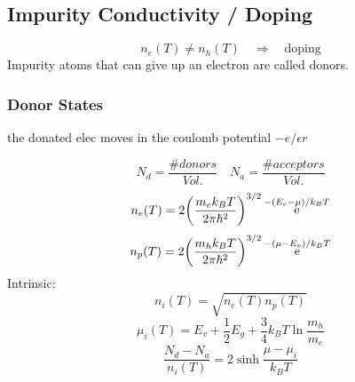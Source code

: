 \documentclass[UTF8]{ctexart} %
\DeclareMathOperator{\e}{\mathrm{e}}
\DeclareMathOperator{\dra}{\Rightarrow}
\numberwithin{equation}{section}
\begin{document}
\subsection{Impurity Conductivity / Doping}
\begin{equation}\label{key}
n_e(T) \neq n_h(T) \quad\dra\quad \text{doping}
\end{equation}
Impurity atoms that can give up an electron are called donors.
\subsubsection{Donor States}
the donated elec moves in the coulomb potential $ -e/\epsilon r $

\begin{equation}\label{key}
N_d = \dfrac{\#donors}{Vol.} \quad N_a = \dfrac{\#acceptors}{Vol.}
\end{equation}
\begin{equation}\label{key}
n_e(T) = 2\qty(\dfrac{m_e k_B T}{2\pi\hbar^2})^{3/2}\e^{-(E_c - \mu)/k_B T}
\end{equation}
\begin{equation}\label{key}
n_p(T) = 2\qty(\dfrac{m_h k_B T}{2\pi\hbar^2})^{3/2}\e^{-(\mu - E_v)/k_B T}
\end{equation}
Intrinsic: 
\begin{equation}\label{key}
n_i(T) = \sqrt{n_e(T)n_p(T)}
\end{equation}
\begin{equation}\label{key}
\mu_i(T) = E_v + \dfrac{1}{2}E_g + \dfrac{3}{4}k_B T\ln\dfrac{m_h}{m_e}
\end{equation}
\begin{equation}\label{key}
\dfrac{N_d - N_a}{n_i(T)} = 2\sinh\dfrac{\mu - \mu_i}{k_B T}
\end{equation}
\end{document}
